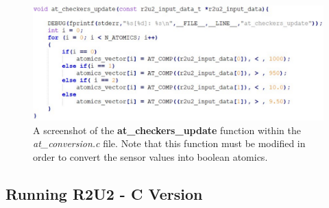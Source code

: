 \begin{figure}[H]
	\begin{center}
		\includegraphics[scale=0.5]{fig/ATconversionScreenshot.pdf}
		\caption{A screenshot of the \textbf{at\_checkers\_update} function within the \textit{at\_conversion.c} file. Note that this function must be modified in order to convert the sensor values into boolean atomics.
		\label{fig:atConversion}}
	\end{center}
\end{figure}

\subsection{Running R2U2 - C Version}
\label{R2U2c}


